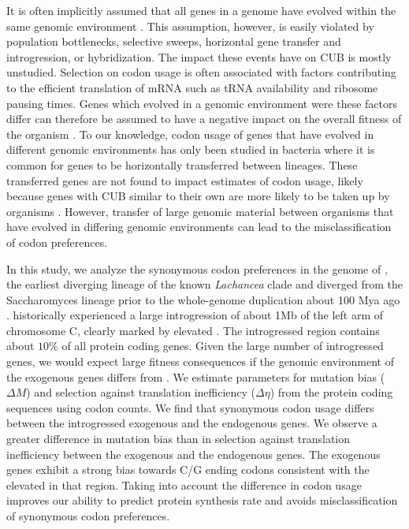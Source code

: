\documentclass[12pt, letter]{article}
\begin{document}
It is often implicitly assumed that all genes in a genome have evolved within the same genomic environment \citep{grantham1981, ikemura1985, sharp1988}.
This assumption, however, is easily violated by population bottlenecks, selective sweeps, horizontal gene transfer and introgression, or hybridization.
The impact these events have on CUB is mostly unstudied.
Selection on codon usage is often associated with factors contributing to the efficient translation of mRNA such as tRNA availability \citep{ikemura1985, dong1996, dosreis2004} and ribosome pausing times. %
Genes which evolved in a genomic environment were these factors differ can therefore be assumed to have a negative impact on the overall fitness of the organism \citep{peter2015}. 
To our knowledge, codon usage of genes that have evolved in different genomic environments has only been studied in bacteria where it is common for genes to be horizontally transferred between lineages.
These transferred genes are not found to impact estimates of codon usage, likely because genes with CUB similar to their own are more likely to be taken up by organisms \citep{tuller2011}.
However, transfer of large genomic material between organisms that have evolved in differing genomic environments can lead to the misclassification of codon preferences.

In this study, we analyze the synonymous codon preferences in the genome of \kluyveri, the earliest diverging lineage of the known \textit{Lachancea} clade and diverged from the Saccharomyces lineage prior to the whole-genome duplication about 100 Mya ago \citep{wolfe1997}.
\kluyveri historically experienced a large introgression of about 1Mb of the left arm of chromosome C, clearly marked by elevated \GC \citep{payen2009}.
The introgressed region contains about $10 \%$ of all protein coding genes.
Given the large number of introgressed genes, we would expect large fitness consequences if the genomic environment of the exogenous genes differs from \kluyveri. 
We estimate parameters for mutation bias ($\Delta M$) and selection against translation inefficiency ($\Delta \eta$) from the protein coding sequences using codon counts.
We find that synonymous codon usage differs between the introgressed exogenous and the endogenous genes.
We observe a greater difference in mutation bias than in selection against translation inefficiency between the exogenous and the endogenous genes.
The exogenous genes exhibit a strong bias towards C/G ending codons consistent with the elevated \GC in that region.
Taking into account the difference in codon usage improves our ability to predict protein synthesis rate and avoids misclassification of synonymous codon preferences.
\end{document}
